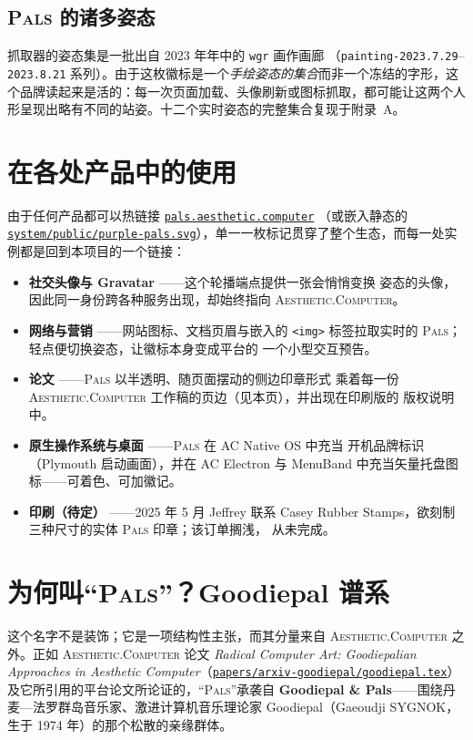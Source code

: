 \documentclass[10pt,letterpaper,twocolumn]{article}
\newcommand{\ac}{\textsc{Aesthetic}{\color{acpink}.}\textsc{Computer}}
\newcommand{\pals}{\textsc{Pals}}
\newcommand{\repofile}[1]{\href{https://github.com/whistlegraph/aesthetic-computer/blob/main/#1}{\texttt{#1}}}
\begin{document}
\subsection{\pals{} 的诸多姿态}

抓取器的姿态集是一批出自 2023 年年中的 \texttt{wgr} 画作画廊
（\texttt{painting-2023.7.29}--\texttt{2023.8.21} 系列）。由于这枚徽标是一个\emph{手绘姿态的集合}而非一个冻结的字形，这个品牌读起来是活的：每一次页面加载、头像刷新或图标抓取，都可能让这两个人形呈现出略有不同的站姿。十二个实时姿态的完整集合复现于附录~A。

\section{在各处产品中的使用}

由于任何产品都可以热链接
\href{https://pals.aesthetic.computer}{\texttt{pals.aesthetic.computer}}
（或嵌入静态的
\repofile{system/public/purple-pals.svg}），单一一枚标记贯穿了整个生态，而每一处实例都是回到本项目的一个链接：

\begin{itemize}
  \item \textbf{社交头像与 Gravatar} ——这个轮播端点提供一张会悄悄变换
        姿态的头像，因此同一身份跨各种服务出现，却始终指向 \ac{}。
  \item \textbf{网络与营销} ——网站图标、文档页眉与嵌入的 \texttt{<img>}
        标签拉取实时的 \pals{}；轻点便切换姿态，让徽标本身变成平台的
        一个小型交互预告。
  \item \textbf{论文} ——\pals{} 以半透明、随页面摆动的侧边印章形式
        乘着每一份 \ac{} 工作稿的页边（见本页），并出现在印刷版的
        版权说明中。
  \item \textbf{原生操作系统与桌面} ——\pals{} 在 AC Native OS 中充当
        开机品牌标识（Plymouth 启动画面），并在 AC Electron 与
        MenuBand 中充当矢量托盘图标——可着色、可加徽记。
  \item \textbf{印刷（待定）} ——2025 年 5 月 Jeffrey 联系 Casey
        Rubber Stamps，欲刻制三种尺寸的实体 \pals{} 印章；该订单搁浅，
        从未完成。
\end{itemize}

\section{为何叫“\pals{}”？Goodiepal 谱系}

这个名字不是装饰；它是一项结构性主张，而其分量来自 \ac{} 之外。正如 \ac{} 论文
\emph{Radical Computer Art: Goodiepalian Approaches in Aesthetic
Computer}（\repofile{papers/arxiv-goodiepal/goodiepal.tex}）及它所引用的平台论文所论证的，“\pals{}”承袭自 \textbf{Goodiepal \&
Pals}——围绕丹麦—法罗群岛音乐家、激进计算机音乐理论家 Goodiepal（Gaeoudji SYGNOK，生于 1974 年）的那个松散的亲缘群体。
\end{document}
